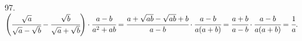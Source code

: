 97. $\left(\cfrac{\sqrt{a}}{\sqrt{a}-\sqrt{b}}-\cfrac{\sqrt{b}}{\sqrt{a}+\sqrt{b}}\right)\cdot\cfrac{a-b}{a^2+ab}=
\cfrac{a+\sqrt{ab}-\sqrt{ab}+b}{a-b}\cdot\cfrac{a-b}{a(a+b)}=
\cfrac{a+b}{a-b}\cdot\cfrac{a-b}{a(a+b)}=\cfrac{1}{a}.$\\
